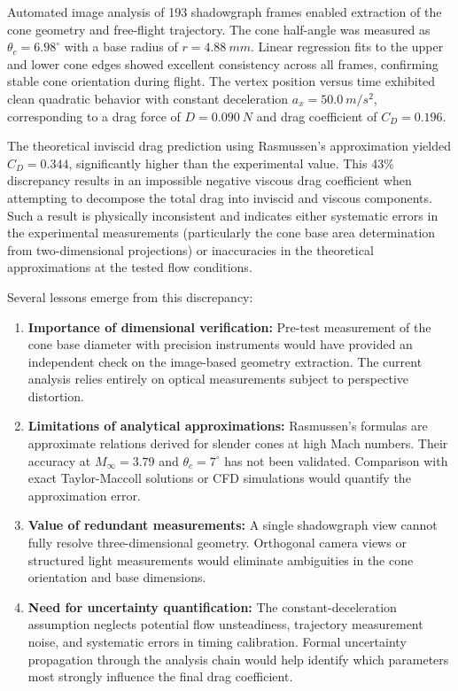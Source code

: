 Automated image analysis of 193 shadowgraph frames enabled extraction of the cone geometry and free-flight trajectory. The cone half-angle was measured as $\theta_c = 6.98^\circ$ with a base radius of $r = \qty{4.88}{mm}$. Linear regression fits to the upper and lower cone edges showed excellent consistency across all frames, confirming stable cone orientation during flight. The vertex position versus time exhibited clean quadratic behavior with constant deceleration $a_x = \qty{50.0}{m/s^2}$, corresponding to a drag force of $D = \qty{0.090}{N}$ and drag coefficient of $C_D = 0.196$.

The theoretical inviscid drag prediction using Rasmussen's approximation yielded $C_D = 0.344$, significantly higher than the experimental value. This 43\% discrepancy results in an impossible negative viscous drag coefficient when attempting to decompose the total drag into inviscid and viscous components. Such a result is physically inconsistent and indicates either systematic errors in the experimental measurements (particularly the cone base area determination from two-dimensional projections) or inaccuracies in the theoretical approximations at the tested flow conditions.

Several lessons emerge from this discrepancy:

\begin{enumerate}
    \item \textbf{Importance of dimensional verification:} Pre-test measurement of the cone base diameter with precision instruments would have provided an independent check on the image-based geometry extraction. The current analysis relies entirely on optical measurements subject to perspective distortion.

    \item \textbf{Limitations of analytical approximations:} Rasmussen's formulas are approximate relations derived for slender cones at high Mach numbers. Their accuracy at $M_\infty = 3.79$ and $\theta_c = 7^\circ$ has not been validated. Comparison with exact Taylor-Maccoll solutions or CFD simulations would quantify the approximation error.

    \item \textbf{Value of redundant measurements:} A single shadowgraph view cannot fully resolve three-dimensional geometry. Orthogonal camera views or structured light measurements would eliminate ambiguities in the cone orientation and base dimensions.

    \item \textbf{Need for uncertainty quantification:} The constant-deceleration assumption neglects potential flow unsteadiness, trajectory measurement noise, and systematic errors in timing calibration. Formal uncertainty propagation through the analysis chain would help identify which parameters most strongly influence the final drag coefficient.
\end{enumerate}

